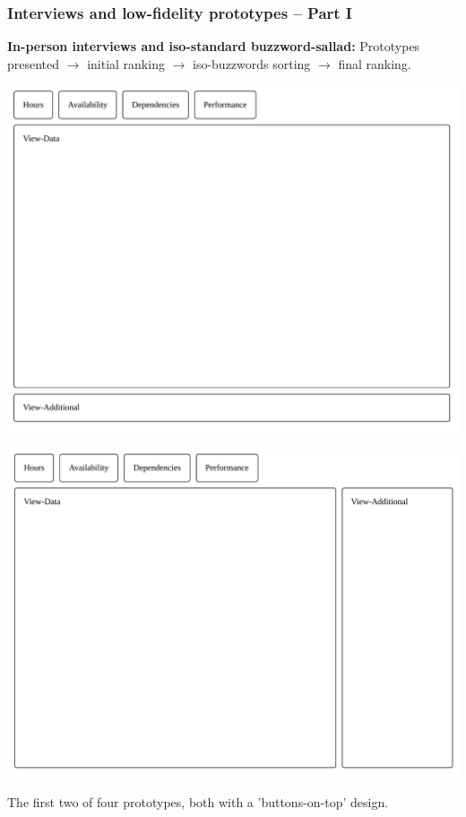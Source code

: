 \documentclass[xcolor=svgnames,10pt,aspectratio=1610]{beamer}
\begin{document}
\begin{frame}
  \frametitle{Interviews and low-fidelity prototypes -- Part I}
  \begin{minipage}{\textwidth}
    \textbf{In-person interviews and iso-standard buzzword-sallad:}
    Prototypes presented $\to$ initial ranking $\to$ iso-buzzwords sorting
    $\to$ final ranking. \\

  \end{minipage}
  \begin{minipage}{\textwidth}
    \begin{minipage}{0.49\textwidth}
      \centering
      \includegraphics[width=1.\textwidth]{../msccls/ui11.pdf}
    \end{minipage}
    \begin{minipage}{0.49\textwidth}
      \centering
      \vspace{-0.22cm}
      \hspace{-0.3cm}
      \includegraphics[width=1.\textwidth]{../msccls/ui12.pdf}
    \end{minipage}
  \end{minipage}
  The first two of four prototypes, both with a 'buttons-on-top' design.
\end{frame}
\end{document}
